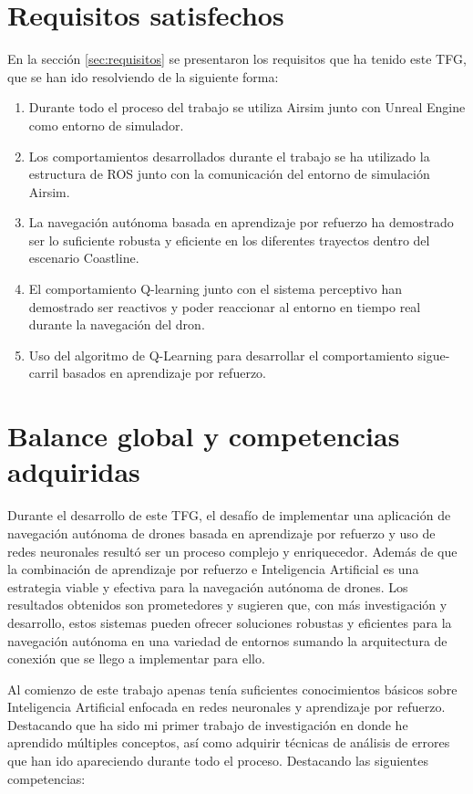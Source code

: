 \section{Requisitos satisfechos}
\label{requisitos_satisfechos}

En la sección \ref{sec:requisitos} se presentaron los requisitos que ha tenido este TFG, que se han ido resolviendo 
de la siguiente forma: 

\begin{enumerate}
    \item Durante todo el proceso del trabajo se utiliza Airsim junto con Unreal Engine como entorno de simulador.
    \item Los comportamientos desarrollados durante el trabajo se ha utilizado la estructura de ROS junto con la comunicación
    del entorno de simulación Airsim. 
    \item La navegación autónoma basada en aprendizaje por refuerzo ha demostrado ser lo suficiente robusta y eficiente en los
    diferentes trayectos dentro del escenario Coastline. 
    \item El comportamiento Q-learning junto con el sistema perceptivo han demostrado ser reactivos y poder reaccionar al entorno en tiempo real
    durante la navegación del dron.
    \item Uso del algoritmo de Q-Learning para desarrollar el comportamiento sigue-carril basados en aprendizaje por 
    refuerzo.
\end{enumerate}


\section{Balance global y competencias adquiridas}
\label{balance_global_competencias_adquiridas}
Durante el desarrollo de este TFG, el desafío de implementar una aplicación de navegación autónoma de drones basada en
aprendizaje por refuerzo y uso de redes neuronales resultó ser un proceso complejo y enriquecedor. Además de que la
combinación de aprendizaje por refuerzo e Inteligencia Artificial es una estrategia viable y efectiva para la
navegación autónoma de drones. Los resultados obtenidos son prometedores y sugieren que, con más investigación y
desarrollo, estos sistemas pueden ofrecer soluciones robustas y eficientes para la navegación autónoma en una variedad
de entornos sumando la arquitectura de conexión que se llego a implementar para ello. 

Al comienzo de este trabajo apenas tenía suficientes conocimientos básicos sobre Inteligencia Artificial enfocada en
redes neuronales y aprendizaje por refuerzo. Destacando que ha sido mi primer trabajo de investigación en donde he
aprendido múltiples conceptos, así como adquirir técnicas de análisis de errores que han ido apareciendo durante todo
el proceso. Destacando las siguientes competencias: 

